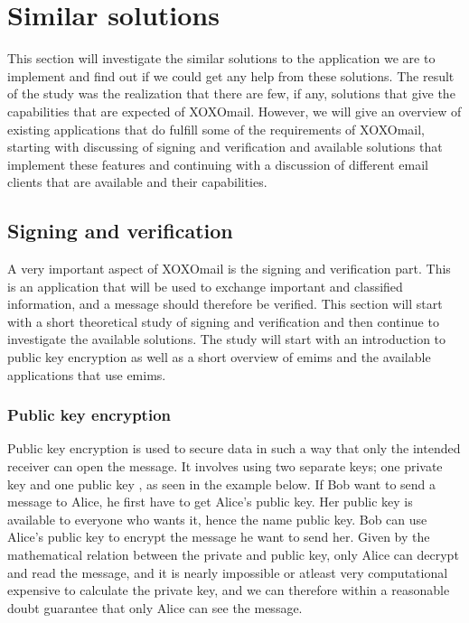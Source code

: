 \section{Similar solutions}\label{sec:similarsol}

This section will investigate the similar solutions to the application we are to implement and find out if we could get any help from these solutions. The result of the study was the realization that there are few, if any, solutions that give the capabilities that are expected of XOXOmail. However, we will give an overview of existing applications that do fulfill some of the requirements of XOXOmail, starting with discussing of signing and verification and available solutions that implement these features and continuing with a discussion of different email clients that are available and their capabilities.

\subsection{Signing and verification}

A very important aspect of XOXOmail is the signing and verification part. This is an application that will be used to exchange important and classified information, and a message should therefore be verified. This section will start with a short theoretical study of signing and verification and then continue to investigate the available solutions. The study will start with an introduction to public key encryption as well as a short overview of \gls{emims} and the available applications that use \gls{emims}.

\newpage

\subsubsection{Public key encryption}
Public key encryption is used to secure data in such a way that only the intended receiver can open the message. It involves using two separate keys; one private key and one public key \cite{bib:pke},
as seen in the example below.
\newline
\newline
If Bob want to send a message to Alice, he first have to get Alice's public key. Her public key is available to everyone who wants it, hence the name public key. Bob can use Alice's public key to encrypt the message he want to send her. Given by the mathematical relation between the private and public key, only Alice can decrypt and read the message, and it is nearly impossible or atleast very computational expensive to calculate the private key, and we can therefore within a reasonable doubt guarantee that only Alice can see the message.

